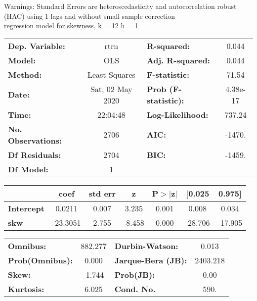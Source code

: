 Warnings: \newline
 [1] Standard Errors are heteroscedasticity and autocorrelation robust (HAC) using 1 lags and without small sample correction\\ 

regression model for skewness, k = 12 h = 1\begin{center}
\begin{tabular}{lclc}
\toprule
\textbf{Dep. Variable:}    &       rtrn       & \textbf{  R-squared:         } &     0.044   \\
\textbf{Model:}            &       OLS        & \textbf{  Adj. R-squared:    } &     0.044   \\
\textbf{Method:}           &  Least Squares   & \textbf{  F-statistic:       } &     71.54   \\
\textbf{Date:}             & Sat, 02 May 2020 & \textbf{  Prob (F-statistic):} &  4.38e-17   \\
\textbf{Time:}             &     22:04:48     & \textbf{  Log-Likelihood:    } &    737.24   \\
\textbf{No. Observations:} &        2706      & \textbf{  AIC:               } &    -1470.   \\
\textbf{Df Residuals:}     &        2704      & \textbf{  BIC:               } &    -1459.   \\
\textbf{Df Model:}         &           1      & \textbf{                     } &             \\
\bottomrule
\end{tabular}
\begin{tabular}{lcccccc}
                   & \textbf{coef} & \textbf{std err} & \textbf{z} & \textbf{P$> |$z$|$} & \textbf{[0.025} & \textbf{0.975]}  \\
\midrule
\textbf{Intercept} &       0.0211  &        0.007     &     3.235  &         0.001        &        0.008    &        0.034     \\
\textbf{skw}       &     -23.3051  &        2.755     &    -8.458  &         0.000        &      -28.706    &      -17.905     \\
\bottomrule
\end{tabular}
\begin{tabular}{lclc}
\textbf{Omnibus:}       & 882.277 & \textbf{  Durbin-Watson:     } &    0.013  \\
\textbf{Prob(Omnibus):} &   0.000 & \textbf{  Jarque-Bera (JB):  } & 2403.218  \\
\textbf{Skew:}          &  -1.744 & \textbf{  Prob(JB):          } &     0.00  \\
\textbf{Kurtosis:}      &   6.025 & \textbf{  Cond. No.          } &     590.  \\
\bottomrule
\end{tabular}
\end{center}

